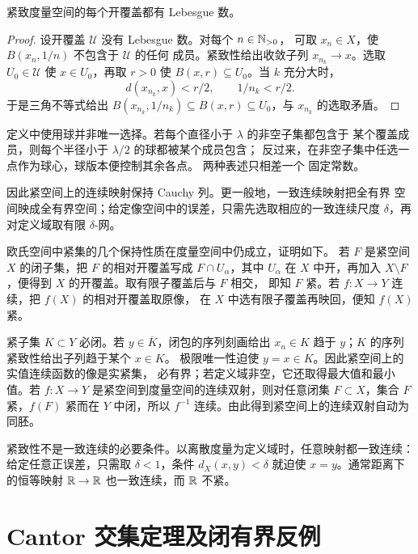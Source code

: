 \begin{theorem}
\label{thm:lebesgue-number-compact-metric}
紧致度量空间的每个开覆盖都有 Lebesgue 数。
\end{theorem}

\begin{proof}
设开覆盖 \(\mathcal U\) 没有 Lebesgue 数。对每个 \(n\in\mathbb{N}_{>0}\)，
可取 \(x_n\in X\)，使 \(B(x_n,1/n)\) 不包含于 \(\mathcal U\) 的任何
成员。紧致性给出收敛子列 \(x_{n_k}\to x\)。选取
\(U_0\in\mathcal U\) 使 \(x\in U_0\)，再取 \(r>0\) 使
\(B(x,r)\subseteq U_0\)。当 \(k\) 充分大时，
\[
 d(x_{n_k},x)<r/2,
 \qquad
 1/n_k<r/2.
\]
于是三角不等式给出
\(B(x_{n_k},1/n_k)\subseteq B(x,r)\subseteq U_0\)，与
\(x_{n_k}\) 的选取矛盾。
\end{proof}

定义中使用球并非唯一选择。若每个直径小于 \(\lambda\) 的非空子集都包含于
某个覆盖成员，则每个半径小于 \(\lambda/2\) 的球都被某个成员包含；
反过来，在非空子集中任选一点作为球心，球版本便控制其余各点。
两种表述只相差一个
固定常数。

因此紧空间上的连续映射保持 Cauchy 列。更一般地，一致连续映射把全有界
空间映成全有界空间；给定像空间中的误差，只需先选取相应的一致连续尺度
\(\delta\)，再对定义域取有限 \(\delta\)-网。

欧氏空间中紧集的几个保持性质在度量空间中仍成立，证明如下。
若 \(F\) 是紧空间 \(X\) 的闭子集，把 \(F\) 的相对开覆盖写成
\(F\cap U_\alpha\)，其中 \(U_\alpha\) 在 \(X\) 中开，再加入
\(X\setminus F\)，便得到 \(X\) 的开覆盖。取有限子覆盖后与 \(F\) 相交，
即知 \(F\) 紧。若 \(f:X\to Y\) 连续，把 \(f(X)\) 的相对开覆盖取原像，
在 \(X\) 中选有限子覆盖再映回，便知 \(f(X)\) 紧。

紧子集 \(K\subset Y\) 必闭。若 \(y\in\overline K\)，闭包的序列刻画给出
\(x_n\in K\) 趋于 \(y\)；\(K\) 的序列紧致性给出子列趋于某个 \(x\in K\)。
极限唯一性迫使 \(y=x\in K\)。因此紧空间上的实值连续函数的像是实紧集，
必有界；若定义域非空，它还取得最大值和最小值。若
\(f:X\to Y\) 是紧空间到度量空间的连续双射，则对任意闭集
\(F\subset X\)，集合 \(F\) 紧，\(f(F)\) 紧而在 \(Y\) 中闭，所以
\(f^{-1}\) 连续。由此得到紧空间上的连续双射自动为同胚。

紧致性不是一致连续的必要条件。以离散度量为定义域时，任意映射都一致连续：
给定任意正误差，只需取 \(\delta<1\)，条件 \(d_X(x,y)<\delta\) 就迫使
\(x=y\)。通常距离下的恒等映射
\(\mathbb{R}\to\mathbb{R}\) 也一致连续，而 \(\mathbb{R}\) 不紧。

\section{Cantor 交集定理及闭有界反例}

